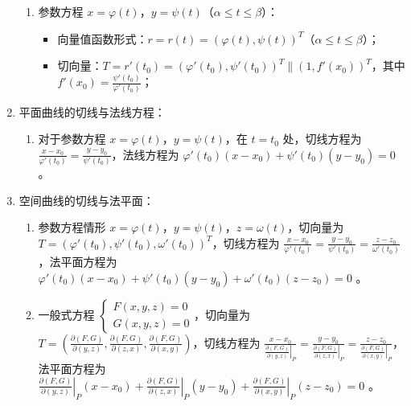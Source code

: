 \documentclass[UTF8]{ctexart}
\theoremstyle{remark}
\begin{document}
\begin{enumerate}
\begin{enumerate}
			\item 参数方程 \(x = \varphi(t)\)，\(y = \psi(t)\)（\(\alpha \leq t \leq \beta\)）：
			\begin{itemize}
				\item 向量值函数形式：\(r = r(t) = (\varphi(t), \psi(t))^T\)（\(\alpha \leq t \leq \beta\)）；
				\item 切向量：\(T = r'(t_0) = (\varphi'(t_0), \psi'(t_0))^T \parallel (1, f'(x_0))^T\)，其中 \(f'(x_0) = \frac{\psi'(t_0)}{\varphi'(t_0)}\)；
			\end{itemize}
		\end{enumerate}

	\item 平面曲线的切线与法线方程：
	\begin{enumerate}
		\item 对于参数方程 \(x = \varphi(t)\)，\(y = \psi(t)\)，在 \(t = t_0\) 处，切线方程为 \(\frac{x - x_0}{\varphi'(t_0)} = \frac{y - y_0}{\psi'(t_0)}\)，法线方程为 \(\varphi'(t_0)(x - x_0) + \psi'(t_0)(y - y_0) = 0\) 。
	\end{enumerate}
	
	\item 空间曲线的切线与法平面：
	\begin{enumerate}
		\item 参数方程情形 \(x = \varphi(t)\)，\(y = \psi(t)\)，\(z = \omega(t)\)，切向量为 \(T = (\varphi'(t_0), \psi'(t_0), \omega'(t_0))^T\)，切线方程为 \(\frac{x - x_0}{\varphi'(t_0)} = \frac{y - y_0}{\psi'(t_0)} = \frac{z - z_0}{\omega'(t_0)}\)，法平面方程为 \(\varphi'(t_0)(x - x_0) + \psi'(t_0)(y - y_0) + \omega'(t_0)(z - z_0) = 0\) 。
		\item 一般式方程 \(\begin{cases} F(x, y, z) = 0 \\ G(x, y, z) = 0 \end{cases}\)，切向量为 \(T = \left( \frac{\partial(F, G)}{\partial(y, z)}, \frac{\partial(F, G)}{\partial(z, x)}, \frac{\partial(F, G)}{\partial(x, y)} \right)\)，切线方程为 \(\frac{x - x_0}{\left. \frac{\partial(F, G)}{\partial(y, z)} \right|_P} = \frac{y - y_0}{\left. \frac{\partial(F, G)}{\partial(z, x)} \right|_P} = \frac{z - z_0}{\left. \frac{\partial(F, G)}{\partial(x, y)} \right|_P}\)，法平面方程为 \(\left. \frac{\partial(F, G)}{\partial(y, z)} \right|_P (x - x_0) + \left. \frac{\partial(F, G)}{\partial(z, x)} \right|_P (y - y_0) + \left. \frac{\partial(F, G)}{\partial(x, y)} \right|_P (z - z_0) = 0\) 。
	\end{enumerate}
	

\end{enumerate}
\end{document}
